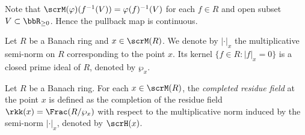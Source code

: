 Note that \(\scrM(\varphi)(f^{-1}(V)) = \varphi(f)^{-1}(V)\) for each \(f \in R\) and open subset \(V \subset \bbR_{\geq 0}\).
Hence the pullback map is continuous.




\begin{notation}\label{notation:norm_and_prime_ideal_associated_to_a_point_in_Berkovich_spectrum}
	Let \(R\) be a Banach ring and \(x \in \scrM(R)\).
	We denote by \(|\cdot|_x\) the multiplicative semi-norm on \(R\) corresponding to the point \(x\).
	Its kernel \(\{f \in R : |f|_x = 0\}\) is a closed prime ideal of \(R\), denoted by \(\wp_x\).
\end{notation}

\begin{definition}\label{def:completed_residue_field}
	Let \(R\) be a Banach ring.
	For each \(x \in \scrM(R)\), the \emph{completed residue field} at the point \(x\) is defined as the completion of the residue field \(\rkk(x) = \Frac(R/\wp_x)\) with respect to the multiplicative norm induced by the semi-norm \(|\cdot|_x\), denoted by \(\scrH(x)\).
\end{definition}

